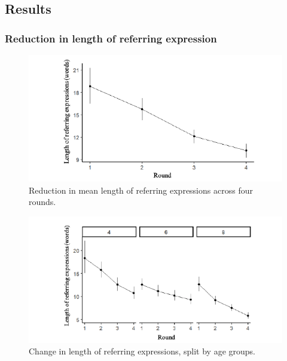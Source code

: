 \documentclass[10pt, letterpaper]{article}
\newenvironment{CodeChunk}{}{}
\begin{document}
\hypertarget{results}{%
\subsection{Results}\label{results}}

\hypertarget{reduction-in-length-of-referring-expression}{%
\subsubsection{Reduction in length of referring
expression}\label{reduction-in-length-of-referring-expression}}

\begin{CodeChunk}
\begin{figure}[b]

{\centering \includegraphics{figs/reduction-1} 

}

\caption[Reduction in mean length of referring expressions across four rounds]{Reduction in mean length of referring expressions across four rounds.}\label{fig:reduction}
\end{figure}
\end{CodeChunk}

\begin{CodeChunk}
\begin{figure}[h]

{\centering \includegraphics{figs/development-1} 

}

\caption[Change in length of referring expressions, split by age groups]{Change in length of referring expressions, split by age groups.}\label{fig:development}
\end{figure}
\end{CodeChunk}
\end{document}
